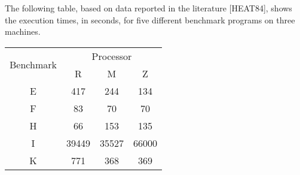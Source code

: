 \documentclass[12pt,largemargins]{homework}
\begin{document}
 The following table, based on data reported in the literature [HEAT84], shows
the execution times, in seconds, for five different benchmark programs on three
machines.\\
\begin{center}

\begin{tabular}{|c|c|c|c|}
	\hline
	\multirow{2}{*}{Benchmark} & \multicolumn{3}{|c|}{Processor} \\
	\cline{2-4}
	& R & M & Z \\
	\hline
	E & 417 & 244 & 134 \\
	\hline
	F & 83 & 70 & 70 \\
	\hline
	H & 66 & 153 & 135\\
	\hline 
	I & 39449 & 35527 & 66000\\
	\hline
	K & 771 & 368 & 369 \\
	\hline
\end{tabular}
\end{center}
\end{document}

